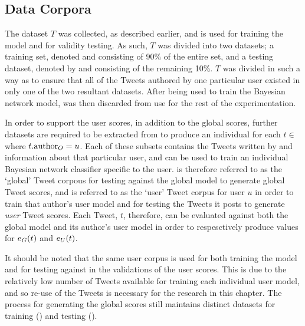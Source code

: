 \subsection{Data Corpora}
The dataset $T$ was collected, as described earlier, and is used for training the model and for validity testing. As such, $T$  was divided into two datasets; a training set, denoted \trainset{} and consisting of 90\% of the entire set, and a testing dataset, denoted by \testset{} and consisting of the remaining 10\%. $T$ was divided in such a way as to ensure that all of the Tweets authored by one particular user existed in only one of the two resultant datasets. After being used to train the Bayesian network model, \trainset{} was then discarded from use for the rest of the experimentation.

In order to support the user scores, in addition to the global scores, further datasets are required to be extracted from \testset{} to produce an individual  for each $t \in $\testset{} where $t.\textrm{author}_O = u$. Each of these subsets contains the Tweets written by and information about that particular user, and can be used to train an individual Bayesian network classifier specific to the user. \testset{} is therefore referred to as the `global' Tweet corpous for testing against the global model to generate global Tweet scores, and  is referred to as the `user' Tweet corpus for user $u$ in order to train that author's user model and for testing the Tweets it posts to generate \textit{user} Tweet scores. Each Tweet, $t$, therefore, can be evaluated against both the global model and its author's user model in order to respesctively produce values for $e_G(t)$ and $e_U(t)$.

It should be noted that the same user corpus is used for both training the model and for testing against in the validations of the user scores. This is due to the relatively low number of Tweets available for training each individual user model, and so re-use of the Tweets is necessary for the research in this chapter. The process for generating the global scores still maintains distinct datasets for training (\trainset{}) and testing (\testset{}).


